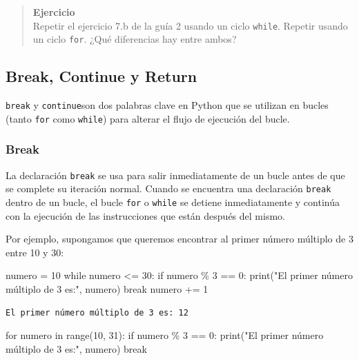 \documentclass[
  letterpaper,
  DIV=11,
  numbers=noendperiod]{scrreprt}
\newenvironment{Shaded}{\begin{snugshade}}{\end{snugshade}}
\newcommand{\BuiltInTok}[1]{\textcolor[rgb]{0.00,0.23,0.31}{#1}}
\newcommand{\ControlFlowTok}[1]{\textcolor[rgb]{0.00,0.23,0.31}{#1}}
\newcommand{\DecValTok}[1]{\textcolor[rgb]{0.68,0.00,0.00}{#1}}
\newcommand{\KeywordTok}[1]{\textcolor[rgb]{0.00,0.23,0.31}{#1}}
\newcommand{\NormalTok}[1]{\textcolor[rgb]{0.00,0.23,0.31}{#1}}
\newcommand{\OperatorTok}[1]{\textcolor[rgb]{0.37,0.37,0.37}{#1}}
\newcommand{\StringTok}[1]{\textcolor[rgb]{0.13,0.47,0.30}{#1}}
\begin{document}
\begin{quote}
\textbf{Ejercicio}\\
Repetir el ejercicio 7.b de la guía 2 usando un ciclo \texttt{while}.
Repetir usando un ciclo \texttt{for}. ¿Qué diferencias hay entre ambos?
~
\end{quote}

\hypertarget{break-continue-y-return}{%
\subsection{Break, Continue y Return}\label{break-continue-y-return}}

\texttt{break} y \texttt{continue}son dos palabras clave en Python que
se utilizan en bucles (tanto \texttt{for} como \texttt{while}) para
alterar el flujo de ejecución del bucle.

\hypertarget{break}{%
\subsubsection{Break}\label{break}}

La declaración \texttt{break} se usa para salir inmediatamente de un
bucle antes de que se complete su iteración normal. Cuando se encuentra
una declaración \texttt{break} dentro de un bucle, el bucle \texttt{for}
o \texttt{while} se detiene inmediatamente y continúa con la ejecución
de las instrucciones que están después del mismo.

Por ejemplo, supongamos que queremos encontrar al primer número múltiplo
de 3 entre 10 y 30:

\begin{Shaded}
\begin{Highlighting}[]
\NormalTok{numero }\OperatorTok{=} \DecValTok{10}
\ControlFlowTok{while}\NormalTok{ numero }\OperatorTok{\textless{}=} \DecValTok{30}\NormalTok{:}
  \ControlFlowTok{if}\NormalTok{ numero }\OperatorTok{\%} \DecValTok{3} \OperatorTok{==} \DecValTok{0}\NormalTok{:}
      \BuiltInTok{print}\NormalTok{(}\StringTok{"El primer número múltiplo de 3 es:"}\NormalTok{, numero)}
      \ControlFlowTok{break}
\NormalTok{  numero }\OperatorTok{+=} \DecValTok{1}
\end{Highlighting}
\end{Shaded}

\begin{verbatim}
El primer número múltiplo de 3 es: 12
\end{verbatim}

\begin{Shaded}
\begin{Highlighting}[]
\ControlFlowTok{for}\NormalTok{ numero }\KeywordTok{in} \BuiltInTok{range}\NormalTok{(}\DecValTok{10}\NormalTok{, }\DecValTok{31}\NormalTok{):}
  \ControlFlowTok{if}\NormalTok{ numero }\OperatorTok{\%} \DecValTok{3} \OperatorTok{==} \DecValTok{0}\NormalTok{:}
      \BuiltInTok{print}\NormalTok{(}\StringTok{"El primer número múltiplo de 3 es:"}\NormalTok{, numero)}
      \ControlFlowTok{break}
\end{Highlighting}
\end{Shaded}
\end{document}
